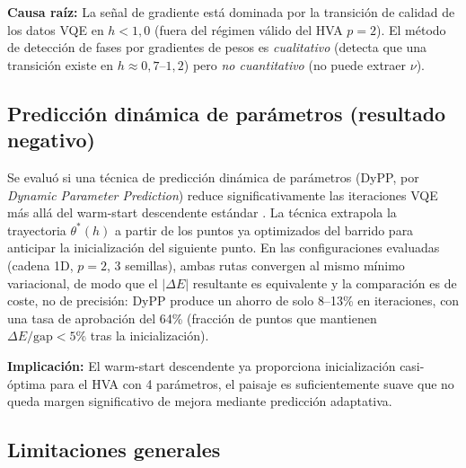 \documentclass[11pt,a4paper,spanish]{book}
\begin{document}
\textbf{Causa raíz:} La señal de gradiente está dominada por la transición de calidad de los datos VQE en $h < 1,0$ (fuera del régimen válido del HVA $p = 2$). El método de detección de fases por gradientes de pesos es \emph{cualitativo} (detecta que una transición existe en $h \approx 0,7$--$1,2$) pero \emph{no cuantitativo} (no puede extraer $\nu$).

\subsection{Predicción dinámica de parámetros (resultado negativo)}

Se evaluó si una técnica de predicción dinámica de parámetros (DyPP, por \emph{Dynamic Parameter Prediction}) reduce significativamente las iteraciones VQE más allá del warm-start descendente estándar \citep{puig2025}. La técnica extrapola la trayectoria $\theta^*(h)$ a partir de los puntos ya optimizados del barrido para anticipar la inicialización del siguiente punto. En las configuraciones evaluadas (cadena 1D, $p = 2$, 3 semillas), ambas rutas convergen al mismo mínimo variacional, de modo que el $|\Delta E|$ resultante es equivalente y la comparación es de coste, no de precisión: DyPP produce un ahorro de solo 8--13\% en iteraciones, con una tasa de aprobación del 64\% (fracción de puntos que mantienen $\Delta E/\text{gap} < 5\%$ tras la inicialización).

\textbf{Implicación:} El warm-start descendente ya proporciona inicialización casi-óptima para el HVA con 4 parámetros, el paisaje es suficientemente suave \citep{mele2022} que no queda margen significativo de mejora mediante predicción adaptativa.

\subsection{Limitaciones generales}
\end{document}
